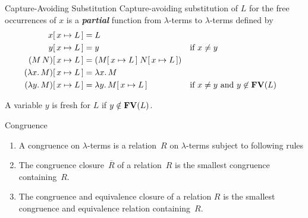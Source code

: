 \begin{frame}{Capture-Avoiding Substitution}
  Capture-avoiding substitution of $L$ for the \alert{free occurrences} of $x$ is a
  \textbf{\emph{partial}} function from $\lambda$-terms to $\lambda$-terms defined by
  \begin{align*}
    x\subst{x}{L} & = L \\
    y\subst{x}{L} & = y && \text{if $x \neq y$} \\
    (M\, N)\subst{x}{L} & = (M\subst{x}{L}\; N\subst{x}{L}) \\
    (\lambda x.\, M)\subst{x}{L} & = \lambda x.\, M \\
    (\lambda y.\, M)\subst{x}{L} & = \lambda y.\, M\subst x L
                                 &&\text{if $x \neq y$ and $y \not\in \FV(L)$}
  \end{align*}
  \begin{definition}[Freshness]
    A variable $y$ is \alert{fresh} for $L$ if $y \notin \FV(L)$.  
  \end{definition}
\end{frame}
\begin{frame}{Congruence}
\begin{definition}
  \begin{enumerate}
    \item A \alert{congruence} on $\lambda$-terms is a 
      relation~$R$ on $\lambda$-terms subject to following rules
      \begin{multicols}{2}
        \begin{prooftree}
        \end{prooftree}
        \begin{prooftree}
        \end{prooftree}
        \begin{prooftree}
        \end{prooftree}
      \end{multicols}
    \item The \alert{congruence closure}~$\overline{R}$ of a relation~$R$ is
      the smallest congruence containing~$R$. 
    \item The \alert{congruence and equivalence closure} of a relation $R$ 
      is the smallest congruence and equivalence relation
      containing~$R$. 
  \end{enumerate}
\end{definition}
\end{frame}

